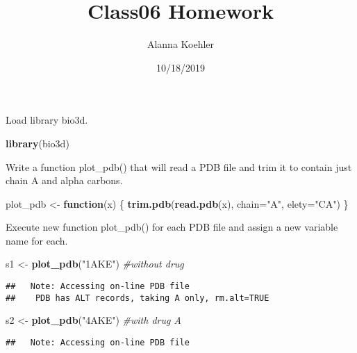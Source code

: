 \documentclass[]{article}
\title{Class06 Homework}
\author{Alanna Koehler}
\date{10/18/2019}
\newenvironment{Shaded}{\begin{snugshade}}{\end{snugshade}}
\newcommand{\CommentTok}[1]{\textcolor[rgb]{0.56,0.35,0.01}{\textit{#1}}}
\newcommand{\ControlFlowTok}[1]{\textcolor[rgb]{0.13,0.29,0.53}{\textbf{#1}}}
\newcommand{\DataTypeTok}[1]{\textcolor[rgb]{0.13,0.29,0.53}{#1}}
\newcommand{\KeywordTok}[1]{\textcolor[rgb]{0.13,0.29,0.53}{\textbf{#1}}}
\newcommand{\NormalTok}[1]{#1}
\newcommand{\StringTok}[1]{\textcolor[rgb]{0.31,0.60,0.02}{#1}}
\begin{document}
\maketitle

Load library bio3d.

\begin{Shaded}
\begin{Highlighting}[]
\KeywordTok{library}\NormalTok{(bio3d)}
\end{Highlighting}
\end{Shaded}

Write a function plot\_pdb() that will read a PDB file and trim it to
contain just chain A and alpha carbons.

\begin{Shaded}
\begin{Highlighting}[]
\NormalTok{plot_pdb <-}\StringTok{ }\ControlFlowTok{function}\NormalTok{(x) \{}
  \KeywordTok{trim.pdb}\NormalTok{(}\KeywordTok{read.pdb}\NormalTok{(x), }\DataTypeTok{chain=}\StringTok{"A"}\NormalTok{, }\DataTypeTok{elety=}\StringTok{"CA"}\NormalTok{) }
\NormalTok{\}}
\end{Highlighting}
\end{Shaded}

Execute new function plot\_pdb() for each PDB file and assign a new
variable name for each.

\begin{Shaded}
\begin{Highlighting}[]
\NormalTok{s1 <-}\StringTok{ }\KeywordTok{plot_pdb}\NormalTok{(}\StringTok{"1AKE"}\NormalTok{) }\CommentTok{#without drug}
\end{Highlighting}
\end{Shaded}

\begin{verbatim}
##   Note: Accessing on-line PDB file
##    PDB has ALT records, taking A only, rm.alt=TRUE
\end{verbatim}

\begin{Shaded}
\begin{Highlighting}[]
\NormalTok{s2 <-}\StringTok{ }\KeywordTok{plot_pdb}\NormalTok{(}\StringTok{"4AKE"}\NormalTok{) }\CommentTok{#with drug A}
\end{Highlighting}
\end{Shaded}

\begin{verbatim}
##   Note: Accessing on-line PDB file
\end{verbatim}
\end{document}
